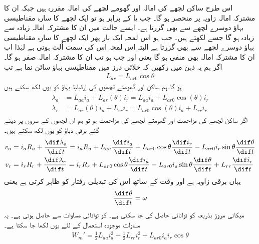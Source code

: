 اس طرح ساکن لچھے کی امالہ  اور گھومے لچھے کی امالہ  مقررہ ہیں جبکہ ان کا مشترکہ امالہ  زاویہ  پر منحصر ہو گا۔ جب  یا   کے برابر ہو تو ایک لچھے کا سارہ مقناطیسی بہاؤ دوسرے لچھے سے بھی گزرتا ہے۔ ایسے حالت میں ان کا مشترکہ امالہ زیادہ سے زیادہ ہو گا جسے  لکھتے ہیں۔ جب   ہو اس لمحہ ایک بار پھر ایک لچھے کا سارہ مقناطیسی بہاؤ دوسرے لچھے سے بھی گزرتا ہے البتہ اس لمحہ اس کی سمت اُلٹ ہوتی ہے لہٰذا اب ان کا مشترکہ امالہ بھی منفی ہو گا یعنی  اور جب  ہو  تب ان کا مشترکہ امالہ صفر ہو گا۔ اگر ہم یہ ذہن میں رکھیں کہ خلائی درز میں  مقناطیسی بہاؤ سائن نما ہے تب
\begin{align}
L_{ar}=L_{ar0} \cos \theta
\end{align}
ہو گا۔ہم ساکن اور گھومتے لچھوں کی اِرتَباطِ بہاؤ کو یوں لکھ سکتے ہیں
\begin{gather}
\begin{aligned}
\lambda_a&=L_{aa} i_a+L_{ar}(\theta) i_r=L_{aa} i_a+L_{ar0} \cos (\theta) i_r\\
\lambda_r&=L_{ar}(\theta) i_a+L_{rr} i_r=L_{ar0} \cos (\theta) i_a+L_{rr} i_r
\end{aligned}
\end{gather}
اگر ساکن لچھے کی مزاحمت  اور گھومتے لچھے کی مزاحمت  ہو تو ہم ان لچھوں کے سروں پر دیئے گئے برقی دباؤ کو یوں لکھ سکتے ہیں۔
\begin{gather}
\begin{aligned}
v_a&=i_a R_a +\frac{\dif \lambda_a}{\dif t}=i_a R_a+L_{aa} \frac{\dif i_a}{\dif t}+L_{ar0} \cos \theta \frac{\dif i_r}{\dif t}-L_{ar0}  i_r \sin \theta  \frac{\dif \theta}{\dif t}\\
v_r&=i_r R_r +\frac{\dif \lambda_r}{\dif t}=i_r R_r+L_{ar0} \cos \theta \frac{\dif i_a}{\dif t}-L_{ar0} i_a \sin \theta  \frac{\dif \theta}{\dif t}+L_{rr} \frac{\dif i_r}{\dif t}
\end{aligned}
\end{gather}
یہاں  برقی زاویہ ہے اور وقت کے ساتھ اس کی تبدیلی رفتار  کو ظاہر کرتی ہے یعنی
\begin{align}
\frac{\dif \theta}{\dif t}=\omega
\end{align}
میکانی مروڑ بذریعہ کو توانائی حاصل کی جا سکتی ہے۔ کو توانائی مساوات  سے حاصل ہوتی ہے۔ یہ مساوات موجودہ استعمال کے لئے یوں لکھا جا سکتا ہے۔
\begin{align}
W_m'=\frac{1}{2} L_{aa} i_a^2+\frac{1}{2} L_{rr} i_r^2+L_{ar0} i_a i_r \cos \theta
\end{align}
